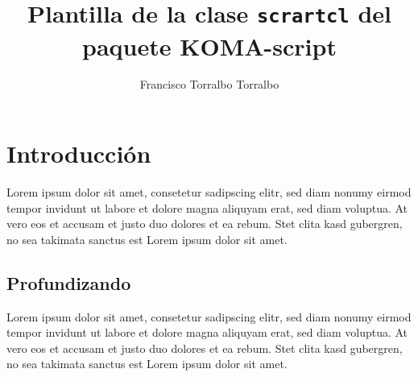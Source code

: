 \documentclass[a4paper]{scrartcl}
\title{Plantilla de la clase \texttt{scrartcl} del paquete KOMA-script}
\author{Francisco Torralbo Torralbo}
\begin{document}
\maketitle

\section{Introducción}
Lorem ipsum dolor sit amet, consetetur sadipscing elitr, sed diam nonumy eirmod
tempor invidunt ut labore et dolore magna aliquyam erat, sed diam voluptua. At
vero eos et accusam et justo duo dolores et ea rebum. Stet clita kasd gubergren,
no sea takimata sanctus est Lorem ipsum dolor sit amet. 

\subsection{Profundizando}
Lorem ipsum dolor sit amet, consetetur sadipscing elitr, sed diam nonumy eirmod
tempor invidunt ut labore et dolore magna aliquyam erat, sed diam voluptua. At
vero eos et accusam et justo duo dolores et ea rebum. Stet clita kasd gubergren,
no sea takimata sanctus est Lorem ipsum dolor sit amet.
\end{document}
